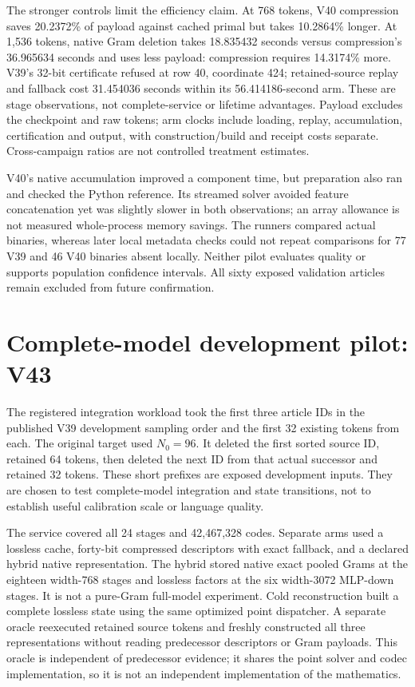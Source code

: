 \documentclass[10pt,twocolumn,letterpaper]{article}
\begin{document}
The stronger controls limit the efficiency claim. At 768 tokens, V40 compression
saves 20.2372\% of payload against cached primal but takes 10.2864\% longer.
At 1,536 tokens, native Gram deletion takes 18.835432 seconds versus compression's
36.965634 seconds and uses less payload: compression requires 14.3174\% more.
V39's 32-bit certificate refused at row 40, coordinate 424; retained-source replay
and fallback cost 31.454036 seconds within its 56.414186-second arm. These are
stage observations, not complete-service or lifetime advantages. Payload excludes
the checkpoint and raw tokens; arm clocks include loading, replay, accumulation,
certification and output, with construction/build and receipt costs separate.
Cross-campaign ratios are not controlled treatment estimates.

V40's native accumulation improved a component time, but preparation also ran
and checked the Python reference. Its streamed solver avoided feature
concatenation yet was slightly slower in both observations; an array allowance
is not measured whole-process memory savings. The runners compared actual
binaries, whereas later local metadata checks could not repeat comparisons for
77 V39 and 46 V40 binaries absent locally. Neither pilot evaluates quality or
supports population confidence intervals. All sixty exposed validation articles
remain excluded from future confirmation.

\section{Complete-model development pilot: V43}
\label{sec:v43}
The registered integration workload took the first three article IDs in the
published V39 development sampling order and the first 32 existing tokens from
each. The original target used $N_0=96$. It deleted the first sorted source ID,
retained 64 tokens, then deleted the next ID from that actual successor and retained
32 tokens. These short prefixes are exposed development inputs. They are chosen
to test complete-model integration and state transitions, not to establish useful
calibration scale or language quality.

The service covered all 24 stages and 42,467,328 codes. Separate arms used a lossless
cache, forty-bit compressed descriptors with exact fallback, and a declared hybrid
native representation. The hybrid stored native exact pooled Grams at the eighteen
width-768 stages and lossless factors at the six width-3072 MLP-down stages. It is
not a pure-Gram full-model experiment. Cold reconstruction built a complete
lossless state using the same optimized point dispatcher. A separate oracle
reexecuted retained source tokens and freshly constructed all three representations
without reading predecessor descriptors or Gram payloads. This oracle is
independent of predecessor evidence; it shares the point solver and codec
implementation, so it is not an independent implementation of the mathematics.
\end{document}
